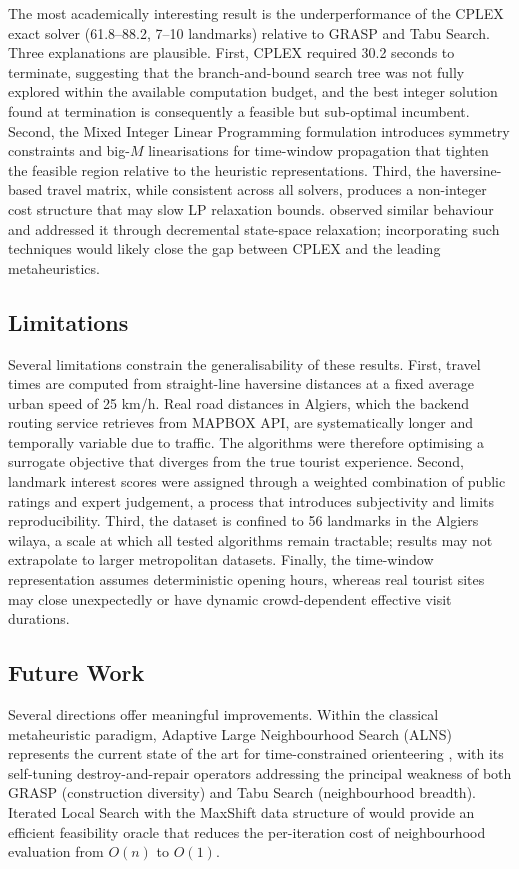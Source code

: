 The most academically interesting result is the underperformance
of the CPLEX exact solver (61.8--88.2, 7--10 landmarks) relative
to GRASP and Tabu Search. Three explanations are plausible. First,
CPLEX required 30.2 seconds to terminate, suggesting that the
branch-and-bound search tree was not fully explored within the
available computation budget, and the best integer solution found
at termination is consequently a feasible but sub-optimal
incumbent. Second, the Mixed Integer Linear Programming
formulation introduces symmetry constraints and big-$M$
linearisations for time-window propagation that tighten the
feasible region relative to the heuristic representations. Third,
the haversine-based travel matrix, while consistent across all
solvers, produces a non-integer cost structure that may slow LP
relaxation bounds. \textcite{Righini2009} observed similar
behaviour and addressed it through decremental state-space
relaxation; incorporating such techniques would likely close the
gap between CPLEX and the leading metaheuristics.

\subsection{Limitations}

Several limitations constrain the generalisability of these
results. First, travel times are computed from straight-line
haversine distances at a fixed average urban speed of 25 km/h.
Real road distances in Algiers, which the backend routing service
retrieves from MAPBOX API, are systematically longer and temporally
variable due to traffic. The algorithms were therefore optimising
a surrogate objective that diverges from the true tourist
experience. Second, landmark interest scores were assigned through
a weighted combination of public ratings and expert judgement, a
process that introduces subjectivity and limits
reproducibility. Third, the dataset is confined to 56 landmarks
in the Algiers wilaya, a scale at which all tested algorithms
remain tractable; results may not extrapolate to larger
metropolitan datasets. Finally, the time-window representation
assumes deterministic opening hours, whereas real tourist sites
may close unexpectedly or have dynamic crowd-dependent effective
visit durations.

\subsection{Future Work}

Several directions offer meaningful improvements. Within the
classical metaheuristic paradigm, Adaptive Large Neighbourhood
Search (ALNS) represents the current state of the art for
time-constrained orienteering \parencite{Gunawan2016}, with its
self-tuning destroy-and-repair operators addressing the principal
weakness of both GRASP (construction diversity) and Tabu Search
(neighbourhood breadth). Iterated Local Search with the MaxShift
data structure of \textcite{Vansteenwegen2009} would provide an
efficient feasibility oracle that reduces the per-iteration cost
of neighbourhood evaluation from $O(n)$ to $O(1)$.

